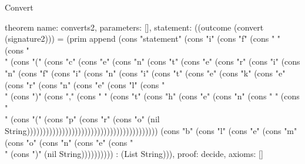 \begin{lexlean}{Convert}
\begin{semanticmodule}
theorem{
  name: converts2,
  parameters: [],
  statement: ((outcome (convert (signature2))) = (prim append (cons "statement" (cons "i" (cons "f" (cons " " (cons "\\" (cons "(" (cons "c" (cons "e" (cons "n" (cons "t" (cons "e" (cons "r" (cons "i" (cons "n" (cons "f" (cons "i" (cons "n" (cons "i" (cons "t" (cons "e" (cons "k" (cons "e" (cons "r" (cons "n" (cons "e" (cons "l" (cons "\\" (cons ")" (cons "," (cons " " (cons "t" (cons "h" (cons "e" (cons "n" (cons " " (cons "\\" (cons "(" (cons "p" (cons "r" (cons "o" (nil String))))))))))))))))))))))))))))))))))))))))) (cons "b" (cons "l" (cons "e" (cons "m" (cons "o" (cons "n" (cons "e" (cons "\\" (cons ")" (nil String)))))))))) : (List String))),
  proof: decide{},
  axioms: []
}


\end{semanticmodule}
\end{lexlean}
